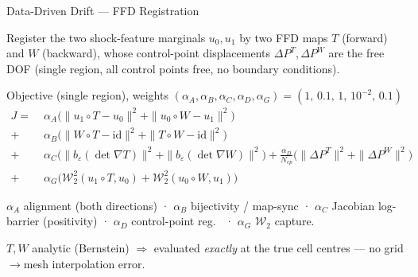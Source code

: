 \documentclass[aspectratio=169]{beamer}
\newcommand{\grad}{\nabla}
\newcommand{\id}{\mathrm{id}}
\begin{document}
\begin{frame}{Data-Driven Drift — FFD Registration}

Register the two shock-feature marginals $u_0,u_1$ by two FFD maps $T$ (forward)
and $W$ (backward), whose control-point displacements $\Delta P^{T},\Delta P^{W}$
are the free DOF (single region, all control points free, no boundary conditions).

\begin{block}{Objective (single region), weights $(\alpha_A,\alpha_B,\alpha_C,\alpha_D,\alpha_G)=(1,\,0.1,\,1,\,10^{-2},\,0.1)$}
{\small
\begin{align*}
J=\;&\alpha_A\bigl(\|u_1\!\circ T-u_0\|^2+\|u_0\!\circ W-u_1\|^2\bigr)\\
 +\;&\alpha_B\bigl(\|W\!\circ T-\id\|^2+\|T\!\circ W-\id\|^2\bigr)\\
 +\;&\alpha_C\bigl(\|b_\varepsilon(\det\grad T)\|^2+\|b_\varepsilon(\det\grad W)\|^2\bigr)
    +\tfrac{\alpha_D}{N_{cp}}\bigl(\|\Delta P^{T}\|^2+\|\Delta P^{W}\|^2\bigr)\\
 +\;&\alpha_G\bigl(\mathcal{W}_2^2(u_1\!\circ T,u_0)+\mathcal{W}_2^2(u_0\!\circ W,u_1)\bigr)
\end{align*}}
\end{block}

{\footnotesize
$\alpha_A$ alignment (both directions)\; · \;$\alpha_B$ bijectivity / map-sync \;
· \;$\alpha_C$ Jacobian log-barrier (positivity) \; · \;$\alpha_D$ control-point reg.\ \;
· \;$\alpha_G$ $\mathcal{W}_2$ capture.\par
$T,W$ analytic (Bernstein) $\Rightarrow$ evaluated \emph{exactly} at the true cell
centres — no grid$\to$mesh interpolation error.}

\end{frame}
\end{document}
